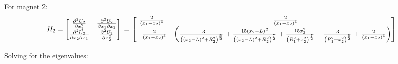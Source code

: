 \documentclass[english]{article}
\begin{document}
For magnet 2:
$$H_2 = \begin{bmatrix}
	\frac{\partial ^2 U_2}{\partial x_1^2} & \frac{\partial ^2 U_2}{\partial x_1 \partial x_2}\\
	\frac{\partial ^2 U_2}{\partial x_2 \partial x_1} & \frac{\partial ^2 U_2}{\partial x_2^2}
\end{bmatrix}
\\=
\begin{bmatrix}
	\frac{2}{\left(x_1-x_2\right)^3}	
	& 
	-\frac{2}{\left(x_1-x_2\right)^3}\\
	-\frac{2}{\left(x_1-x_2\right)^3}
	&
	\left(\frac{-3}{\left(\left(x_2 - L\right)^2 + R_2^2\right)^{\frac{5}{2}}} + \frac{15\left(x_2-L\right)^2}{\left(\left(x_2 - L\right)^2 + R_2^2\right)^{\frac{7}{2}}} + \frac{15x_2^2}{\left(R_1^2 + x_2^2 \right)^{\frac{7}{2}}} - \frac{3}{\left(R_1^2 + x_2^2 \right)^{\frac{5}{2}}} + \frac{2}{\left(x_1-x_2\right)^3}\right)
\end{bmatrix}
$$

Solving for the eigenvalues:
\end{document}
